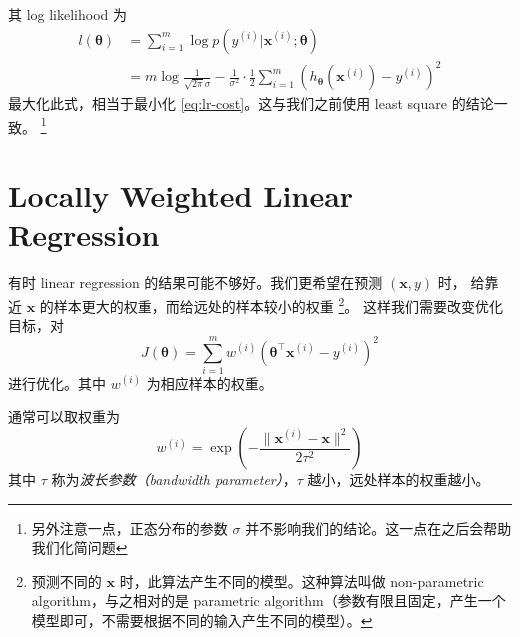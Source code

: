 		其 log likelihood 为 
		\begin{align*}
			l(\bm{\theta}) &= \sum_{i=1}^{m} \log p(y^{(i)} | \bm{x}^{(i)}; \bm{\theta}) \\
			&= m\log \frac{1}{\sqrt{2\pi}\sigma} - \frac{1}{\sigma^2} \cdot \frac{1}{2} \sum_{i=1}^{m} \left( h_{\bm{\theta}}(\bm{x}^{(i)}) - y^{(i)} \right)^2
		\end{align*}
		最大化此式，相当于最小化 \eqref{eq:lr-cost}。这与我们之前使用 least square 的结论一致。
		\footnote{另外注意一点，正态分布的参数 $ \sigma $ 并不影响我们的结论。这一点在之后会帮助我们化简问题}
		
	\section{Locally Weighted Linear Regression}
		有时 linear regression 的结果可能不够好。我们更希望在预测 $ (\bm{x}, y) $ 时，
		给靠近 $ \bm{x} $ 的样本更大的权重，而给远处的样本较小的权重
		\footnote{预测不同的 $ \bm{x} $ 时，此算法产生不同的模型。这种算法叫做 non-parametric algorithm，与之相对的是 parametric algorithm（参数有限且固定，产生一个模型即可，不需要根据不同的输入产生不同的模型）。}。
		这样我们需要改变优化目标，对 
		\begin{equation}
			J(\bm{\theta}) = \sum_{i=1}^{m} w^{(i)} (\bm{\theta}^\intercal \bm{x}^{(i)} - y^{(i)})^2
		\end{equation}
		进行优化。其中 $ w^{(i)} $ 为相应样本的权重。
		
		通常可以取权重为
		\begin{equation}
			w^{(i)} = \exp \left( - \frac{ \| \bm{x}^{(i)} - \bm{x} \|^2 }{2\tau ^2} \right)
		\end{equation}
		其中 $ \tau $ 称为\emph{波长参数（bandwidth parameter）}，$ \tau $ 越小，远处样本的权重越小。
